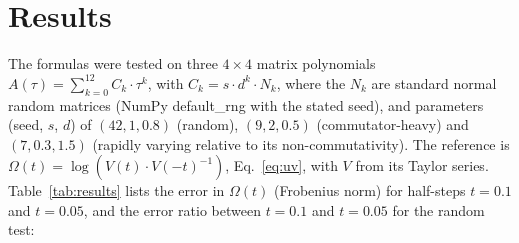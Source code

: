 \documentclass[12pt]{article}
\begin{document}
\section*{Results}

The formulas were tested on three $4\times4$ matrix polynomials $A(\tau)=\sum_{k=0}^{12}C_k\cdot\tau^k$, with $C_k=s\cdot d^k\cdot N_k$, where the $N_k$ are standard normal random matrices (NumPy default\_rng with the stated seed), and parameters (seed, $s$, $d$) of $(42,1,0.8)$ (random), $(9,2,0.5)$ (commutator-heavy) and $(7,0.3,1.5)$ (rapidly varying relative to its non-commutativity). The reference is $\Omega(t)=\log(V(t)\cdot V(-t)^{-1})$, Eq.~\ref{eq:uv}, with $V$ from its Taylor series. Table~\ref{tab:results} lists the error in $\Omega(t)$ (Frobenius norm) for half-steps $t=0.1$ and $t=0.05$, and the error ratio between $t=0.1$ and $t=0.05$ for the random test:
\end{document}
